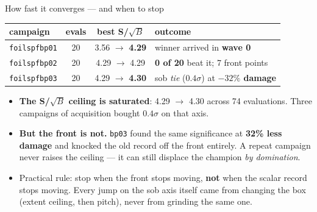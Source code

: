 \documentclass[aspectratio=169,10pt]{beamer}
\begin{document}
\begin{frame}{How fast it converges --- and when to stop}
\small
\begin{center}
\footnotesize
\begin{tabular}{@{}lccl@{}}
\toprule
campaign & evals & best S/$\sqrt{B}$ & outcome \\
\midrule
\texttt{foilspfbp01} & 20 & 3.56 $\rightarrow$ \textbf{4.29} & winner arrived in \textbf{wave 0} \\
\texttt{foilspfbp02} & 20 & 4.29 $\rightarrow$ 4.29 & \textbf{0 of 20} beat it; 7 front points \\
\texttt{foilspfbp03} & 20 & 4.29 $\rightarrow$ \textbf{4.30} & sob \emph{tie} ($0.4\sigma$) at
                                                               \textbf{$-32\%$ damage} \\
\bottomrule
\end{tabular}
\end{center}
\vspace{0.7em}
\begin{itemize}
  \item \textbf{The S/$\sqrt{B}$ ceiling is saturated}: 4.29 $\rightarrow$ 4.30 across 74
        evaluations. Three campaigns of acquisition bought $0.4\sigma$ on that axis.
  \item \textbf{But the front is not.} \texttt{bp03} found the same significance at
        \textbf{32\% less damage} and knocked the old record off the front entirely.
        A repeat campaign never raises the ceiling --- it can still displace the
        champion \emph{by domination}.
  \item Practical rule: stop when the front stops moving, \textbf{not} when the scalar
        record stops moving. Every jump on the sob axis itself came from changing the
        box (extent ceiling, then pitch), never from grinding the same one.
\end{itemize}
\end{frame}
\end{document}
